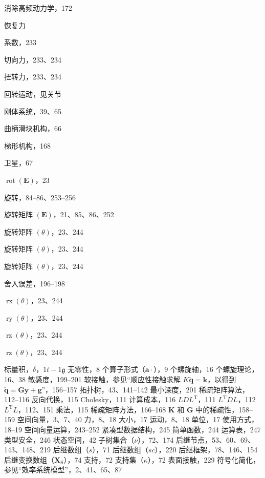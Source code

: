 \documentclass[10pt,a4paper]{book}
\theoremstyle{thmstyle} %
\theoremstyle{defstyle} %
\theoremstyle{prostyle} %
\begin{document}
消除高频动力学，172



恢复力



系数，233



切向力，233、234



扭转力，233、234



回转运动，见关节



刚体系统，39、65



曲柄滑块机构，66



梯形机构，168



卫星，67



$\operatorname{rot}(\boldsymbol{E})$，23



旋转，84–86、253–256



旋转矩阵 $(\boldsymbol{E})$，21、85、86、252



旋转矩阵 $(\theta)$，23、244



旋转矩阵 $(\theta)$，23、244



旋转矩阵 $(\theta)$，23、244



舍入误差，196–198



$\operatorname{rx}(\theta)$，23、244



$\operatorname{ry}(\theta)$，23、244



$\operatorname{rz}(\theta)$，23、244



$\operatorname{rz}(\theta)$，23、244



标量积，$\delta$，$1t-1\mathfrak{g}$ 无零性，8 个算子形式（$\boldsymbol{a}\cdot$），9 个螺旋轴，16 个螺旋理论，16、38 敏感度，199–201 软接触，参见“顺应性接触求解 $K\ddot{\boldsymbol{q}}=\boldsymbol{k}$，以得到 $\ddot{\boldsymbol{q}}=\boldsymbol{G}\ddot{\boldsymbol{y}}+\boldsymbol{g}$”，156–157 拓扑树，43、141–142 最小深度，201 稀疏矩阵算法，112–116 反向代换，115 Cholesky，111 计算成本，116 $LDL^{\mathrm{T}}$，111 $L^{\mathrm{T}}DL$，112 $L^{\mathrm{T}}L$，112、151 乘法，115 稀疏矩阵方法，166–168 $\boldsymbol{K}$ 和 $\boldsymbol{G}$ 中的稀疏性，158–159 空间向量，3、7、40 力，8、18 大小，17 运动，8、18 单位，17 使用方式，18–19 空间向量运算，243–252 紧凑型数据结构，245 简单函数，244 运算表，247 类型安全，246 状态空间，42 子树集合（$\nu$），72、174 后继节点，53、60、69、143、148、219 后继数组（$s$），71 后继数组（$sc$），220 后继框架，78、146、154 后继变换数组（$\boldsymbol{X}_{\mathrm{S}}$），74 支持，72 支持集（$\kappa$），72 表面接触，229 符号化简化，参见“效率系统模型”，2、41、65、87
\end{document}
